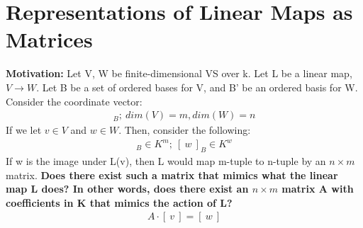 \documentclass[a4paper, 12pt]{article}
\theoremstyle{definition}
\theoremstyle{definition}
\theoremstyle{definition}
\theoremstyle{definition}
\begin{document}
{\section{Representations of Linear Maps as Matrices}
\textbf{Motivation:} Let V, W be finite-dimensional VS over k. Let L be a linear map, $V \rightarrow W$. Let B be a set of ordered bases for V, and B' be an ordered basis for W. 
\newline 
\newline
Consider the coordinate vector: 
\begin{align*}
	[\ v\ ]_B;\ dim(V) = m, dim(W) = n 
\end{align*}
If we let $v \in V$ and $w \in W$. Then, consider the following: 
\begin{align*}
	[\ v\ ]_B \in K^m;\ [\ w\ ]_B \in K^w
\end{align*}
If w is the image under L(v), then L would map m-tuple to n-tuple by an $n \times m$ matrix. \textbf{Does there exist such a matrix that mimics what the linear map L does? In other words, does there exist an $n \times m$ matrix A with coefficients in K that mimics the action of L?} 
\begin{align*}
	A \cdot [\ v\ ] = [\ w\ ] 
\end{align*}

}
\end{document}

